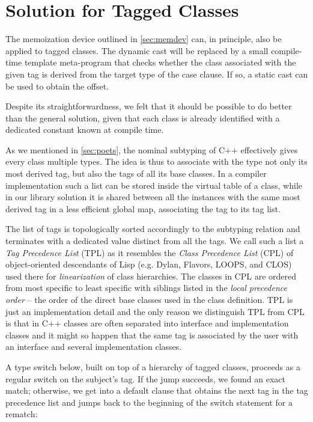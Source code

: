 \documentclass[preprint]{sigplanconf}
\begin{document}
\section{Solution for Tagged Classes}
\label{sec:cotc}

The memoization device outlined in \textsection\ref{sec:memdev} can, in principle, also be 
applied to tagged classes. The dynamic cast will be replaced by a small 
compile-time template meta-program that checks whether the class associated with 
the given tag is derived from the target type of the case clause. If so, a static 
cast can be used to obtain the offset.

Despite its straightforwardness, we felt that it should be possible to do better 
than the general solution, given that each class is already identified with a 
dedicated constant known at compile time.

As we mentioned in \textsection\ref{sec:poets}, the nominal subtyping of C++ 
effectively gives every class multiple types. The idea is thus to associate with 
the type not only its most derived tag, but also the tags of all its base classes.
In a compiler implementation such a list can be stored inside the virtual table 
of a class, while in our library solution it is shared between all the instances 
with the same most derived tag in a less efficient global map, associating the 
tag to its tag list.

The list of tags is topologically sorted accordingly to the subtyping relation 
and terminates with a dedicated value distinct from all the tags. We call such a 
list a \emph{Tag Precedence List} (TPL) as it resembles the \emph{Class 
Precedence List} (CPL) of object-oriented descendants of Lisp (e.g. Dylan, 
Flavors, LOOPS, and CLOS) used there for \emph{linearization} of class 
hierarchies. The classes in CPL are ordered from most specific to least specific 
with siblings listed in the \emph{local precedence order} -- the order of the 
direct base classes used in the class definition. TPL is just an implementation 
detail and the only reason we distinguish TPL from CPL is that in C++ classes 
are often separated into interface and implementation classes and it might so 
happen that the same tag is associated by the user with an interface and several 
implementation classes. 

A type switch below, built on top of a hierarchy of tagged classes, proceeds as 
a regular switch on the subject's tag. If the jump succeeds, we found an exact 
match; otherwise, we get into a default clause that obtains the next tag in the 
tag precedence list and jumps back to the beginning of the switch statement for a 
rematch:
\end{document}
